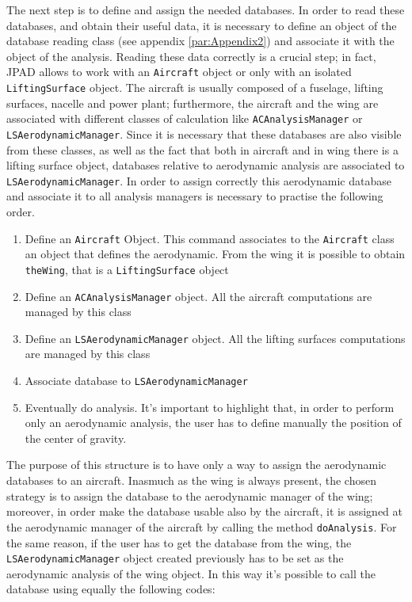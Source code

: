 \bigskip
\noindent
The next step is to define and assign the needed databases. In order to read these databases, and obtain their useful data, it is necessary to define an object
of the database reading class (see appendix \ref{par:Appendix2}) and associate it with the object of the analysis. Reading these data correctly is a crucial step; in fact, \gls{JPAD} allows to work with an \lstinline[language=Java]!Aircraft! object or only with an isolated \lstinline[language=Java]!LiftingSurface! object. The aircraft is usually composed of a fuselage, lifting surfaces, nacelle and power plant; furthermore, the aircraft and the wing are associated with different classes of calculation like \lstinline[language=Java]!ACAnalysisManager! or \lstinline[language=Java]!LSAerodynamicManager!. Since it is necessary that these databases are also visible from these classes, as well as the fact that both in aircraft and in wing there is a lifting surface object, databases relative to aerodynamic analysis are associated to \lstinline[language=Java]!LSAerodynamicManager!. 
%
In order to assign correctly this aerodynamic database and associate it to all analysis managers is necessary to practise the following order.
\begin{enumerate}
\item Define an \lstinline[language=Java]!Aircraft! Object. This command associates to the \lstinline[language=Java]!Aircraft! class an object that defines the aerodynamic. From the wing it is possible to obtain \lstinline[language=Java]!theWing!, that is a \lstinline[language=Java]!LiftingSurface! object
\item Define an \lstinline[language=Java]!ACAnalysisManager! object. All the aircraft computations are managed by this class
\item Define an \lstinline[language=Java]!LSAerodynamicManager! object. All the lifting surfaces computations are managed by this class
\item Associate database to \lstinline[language=Java]!LSAerodynamicManager!
\item Eventually do analysis. It's important to highlight that, in order to perform only an aerodynamic analysis, the user has to define manually the position of the center of gravity.
\end{enumerate} 
%
The purpose of this structure is to have only a way to assign the aerodynamic databases to an aircraft. Inasmuch as the wing is always present, the chosen strategy is to assign the database to the aerodynamic manager of the wing; moreover, in order make the database usable also by the aircraft, it is assigned at the aerodynamic manager of the aircraft by calling the method \lstinline[language=Java]!doAnalysis!. For the same reason, if the user has to get the database from the wing, the \lstinline[language=Java]!LSAerodynamicManager! object created previously has to be set as the aerodynamic analysis of the wing object. In this way it's possible to call the database using equally the following codes:
